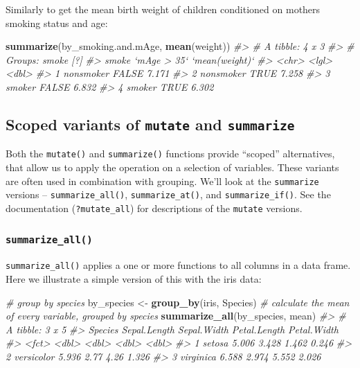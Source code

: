 \documentclass[]{book}
\newenvironment{Shaded}{\begin{snugshade}}{\end{snugshade}}
\newcommand{\CommentTok}[1]{\textcolor[rgb]{0.56,0.35,0.01}{\textit{#1}}}
\newcommand{\KeywordTok}[1]{\textcolor[rgb]{0.13,0.29,0.53}{\textbf{#1}}}
\newcommand{\NormalTok}[1]{#1}
\newcommand{\StringTok}[1]{\textcolor[rgb]{0.31,0.60,0.02}{#1}}
\theoremstyle{definition}
\theoremstyle{definition}
\theoremstyle{definition}
\theoremstyle{remark}
\begin{document}
Similarly to get the mean birth weight of children conditioned on
mothers smoking status and age:

\begin{Shaded}
\begin{Highlighting}[]
\KeywordTok{summarize}\NormalTok{(by_smoking.and.mAge, }\KeywordTok{mean}\NormalTok{(weight))}
\CommentTok{#> # A tibble: 4 x 3}
\CommentTok{#> # Groups:   smoke [?]}
\CommentTok{#>   smoke     `mAge > 35` `mean(weight)`}
\CommentTok{#>   <chr>     <lgl>                <dbl>}
\CommentTok{#> 1 nonsmoker FALSE                7.171}
\CommentTok{#> 2 nonsmoker TRUE                 7.258}
\CommentTok{#> 3 smoker    FALSE                6.832}
\CommentTok{#> 4 smoker    TRUE                 6.302}
\end{Highlighting}
\end{Shaded}

\hypertarget{scoped-variants-of-mutate-and-summarize}{%
\subsection{\texorpdfstring{Scoped variants of \texttt{mutate} and
\texttt{summarize}}{Scoped variants of mutate and summarize}}\label{scoped-variants-of-mutate-and-summarize}}

Both the \texttt{mutate()} and \texttt{summarize()} functions provide
``scoped'' alternatives, that allow us to apply the operation on a
selection of variables. These variants are often used in combination
with grouping. We'll look at the \texttt{summarize} versions --
\texttt{summarize\_all()}, \texttt{summarize\_at()}, and
\texttt{summarize\_if()}. See the documentation (\texttt{?mutate\_all})
for descriptions of the \texttt{mutate} versions.

\hypertarget{summarize_all}{%
\subsubsection{\texorpdfstring{\texttt{summarize\_all()}}{summarize\_all()}}\label{summarize_all}}

\texttt{summarize\_all()} applies a one or more functions to all columns
in a data frame. Here we illustrate a simple version of this with the
iris data:

\begin{Shaded}
\begin{Highlighting}[]
\CommentTok{# group by species}
\NormalTok{by_species <-}\StringTok{ }\KeywordTok{group_by}\NormalTok{(iris, Species)}
\CommentTok{# calculate the mean of every variable, grouped by species}
\KeywordTok{summarize_all}\NormalTok{(by_species, mean)  }
\CommentTok{#> # A tibble: 3 x 5}
\CommentTok{#>   Species    Sepal.Length Sepal.Width Petal.Length Petal.Width}
\CommentTok{#>   <fct>             <dbl>       <dbl>        <dbl>       <dbl>}
\CommentTok{#> 1 setosa            5.006       3.428        1.462       0.246}
\CommentTok{#> 2 versicolor        5.936       2.77         4.26        1.326}
\CommentTok{#> 3 virginica         6.588       2.974        5.552       2.026}
\end{Highlighting}
\end{Shaded}
\end{document}
